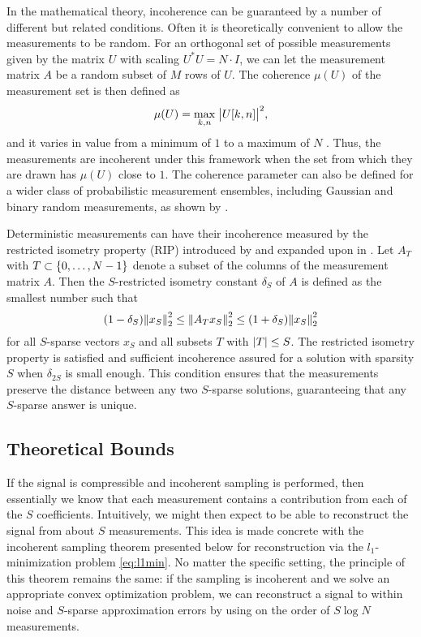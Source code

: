 In the mathematical theory, incoherence can be guaranteed by a number of different but related conditions. Often it is theoretically convenient to allow the measurements to be random. For an orthogonal set of possible measurements given by the matrix $U$ with scaling $U^*U = N \cdot I$, we can let the measurement matrix $A$ be a random subset of $M$ rows of $U$. The coherence $\mu(U)$ of the measurement set is then defined as
\begin{equation}
 \mu(U) = \max_{k,n} \; \abs[\big]{U[k,n]}^2,
\end{equation}
and it varies in value from a minimum of $1$ to a maximum of $N$ \autocite{CR07}. Thus, the measurements are incoherent under this framework when the set from which they are drawn has $\mu(U)$ close to $1$. The coherence parameter can also be defined for a wider class of probabilistic measurement ensembles, including Gaussian and binary random measurements, as shown by \textcite{CP11}.

Deterministic measurements can have their incoherence measured by the restricted isometry property (RIP) introduced by \textcite{CT06} and expanded upon in \textcite{CRT06}. Let $A_T$ with $T \subset \set{0, \dotsc, N-1}$ denote a subset of the columns of the measurement matrix $A$. Then the $S$-restricted isometry constant $\delta_S$ of $A$ is defined as the smallest number such that
\begin{equation}
 (1 - \delta_S)\norm{2}{x_S}^2 \le \norm{2}{A_T x_S}^2 \le (1 + \delta_S)\norm{2}{x_S}^2
\end{equation}
for all $S$-sparse vectors $x_S$ and all subsets $T$ with $\abs{T} \le S$. The restricted isometry property is satisfied and sufficient incoherence assured for a solution with sparsity $S$ when $\delta_{2S}$ is small enough. This condition ensures that the measurements preserve the distance between any two $S$-sparse solutions, guaranteeing that any $S$-sparse answer is unique.

\subsection{Theoretical Bounds}
If the signal is compressible and incoherent sampling is performed, then essentially we know that each measurement contains a contribution from each of the $S$ coefficients. Intuitively, we might then expect to be able to reconstruct the signal from about $S$ measurements. This idea is made concrete with the incoherent sampling theorem presented below for reconstruction via the $l_1$-minimization problem \eqref{eq:l1min}. No matter the specific setting, the principle of this theorem remains the same: if the sampling is incoherent and we solve an appropriate convex optimization problem, we can reconstruct a signal to within noise and $S$-sparse approximation errors by using on the order of $S\log{N}$ measurements.

